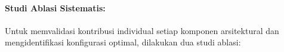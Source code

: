 \documentclass[12pt,a4paper]{book}
\begin{document}
% 

\paragraph{Studi Ablasi Sistematis:}
Untuk memvalidasi kontribusi individual setiap komponen arsitektural dan mengidentifikasi konfigurasi optimal, dilakukan dua studi ablasi:
\end{document}

